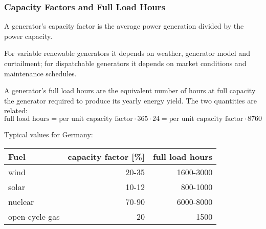 \documentclass[10pt,aspectratio=169,dvipsnames]{beamer}
\begin{document}
\begin{frame}
  \frametitle{Capacity Factors and Full Load Hours}


  A generator's \alert{capacity factor} is the average power generation divided by the power capacity.

  For variable renewable generators it depends on weather, generator model and
  curtailment; for dispatchable generators it depends on market
  conditions and maintenance schedules.

  A generator's \alert{full load hours} are the equivalent number of hours at full capacity the generator required to produce its yearly energy yield.  The two quantities are related:
  \begin{equation*}
    \textrm{full load hours} = \textrm{per unit capacity factor} \cdot 365 \cdot 24 = \textrm{per unit capacity factor} \cdot 8760
  \end{equation*}


  Typical values for Germany:
  \begin{table}[!t]
    \begin{tabular}{lrr}
      \toprule
Fuel & capacity factor [\%] & full load hours \\
\midrule
wind & 20-35 & 1600-3000 \\
solar & 10-12 & 800-1000 \\
nuclear & 70-90 & 6000-8000 \\
open-cycle gas & 20 & 1500 \\
      \bottomrule
    \end{tabular}
  \end{table}


\end{frame}
\end{document}
